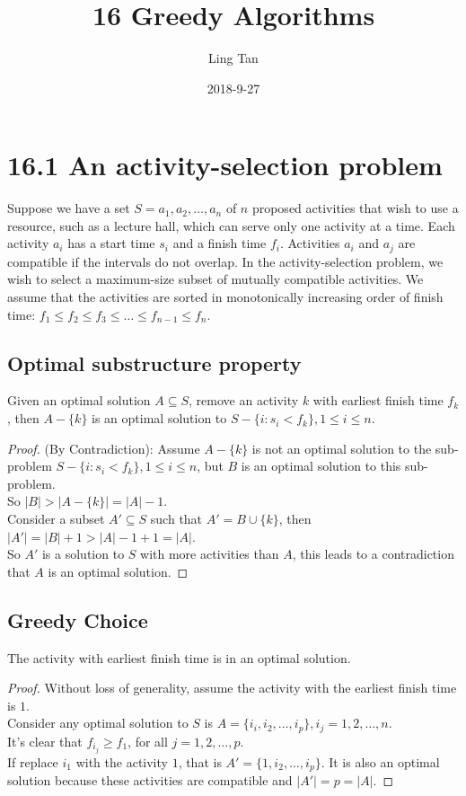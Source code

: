 \documentclass[a4paper]{article}
\title{16 Greedy Algorithms}
\author{Ling Tan}
\date{2018-9-27}
\begin{document}
\maketitle

\section*{16.1 An activity-selection problem}
Suppose we have a set $S={a_1,a_2, \dots, a_n}$ of $n$ proposed activities that wish to use a resource, such as a lecture hall, which can serve only one activity at a time. Each activity $a_i$ has a start time $s_i $ and a finish time $f_i$. Activities $a_i$ and $a_j$ are compatible if the intervals do not overlap. In the activity-selection problem, we wish to select a \color{red}maximum-size \color{black} subset of mutually compatible activities. We assume that the activities are sorted in monotonically increasing order of finish time: $f_1\leq f_2 \leq f_3 \leq \dots \leq f_{n-1} \leq f_n$.

\subsection*{Optimal substructure property}
Given an optimal solution $A\subseteq S$, remove an activity $k$ with earliest finish time $f_k$, then $A-\{k\}$ is an optimal solution to $S-\{i:s_i < f_k\}, 1\leq i\leq n$.
\begin{proof}
(By Contradiction): Assume $A-\{k\}$ is not an optimal solution to the sub-problem $S-\{i:s_i < f_k\}, 1\leq i\leq n$, but $B$ is an optimal solution to this sub-problem.\\
So $|B|>|A-\{k\}|=|A|-1$.\\
Consider a subset $A'\subseteq S$ such that $A'=B\cup \{k\}$, then $|A'|=|B|+1>|A|-1+1=|A|$.\\
So $A'$ is a solution to $S$ with more activities than $A$, this leads to a contradiction that $A$ is an optimal solution. 
\end{proof}

\subsection*{Greedy Choice}
The activity with earliest finish time is in an optimal solution.
\begin{proof}Without loss of generality, assume the activity with the earliest finish time is $1$.\\
Consider any optimal solution to $S$ is $A=\{i_i, i_2,\dots, i_p\}, i_j =1,2,\dots, n$.\\
It's clear that $f_{i_j} \geq f_1$, for all $j=1,2,\dots,p$.\\
If replace $i_1$ with the activity $1$, that is $A'= \{1, i_2, \dots, i_p\}$. It is also an optimal solution because these activities are compatible and $|A'|=p=|A|$.
\end{proof}
\end{document}
